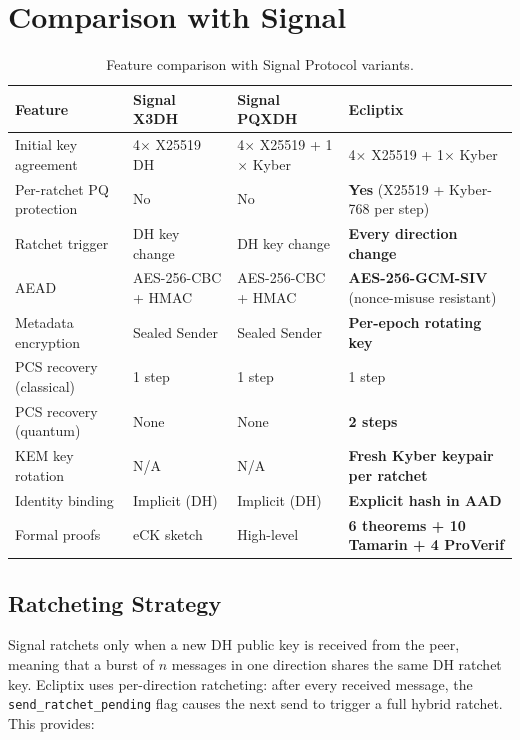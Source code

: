 \documentclass[11pt,a4paper]{article}
\theoremstyle{definition}
\begin{document}
\section{Comparison with Signal}\label{sec:comparison}

\begin{table}[H]
\centering
\caption{Feature comparison with Signal Protocol variants.}\label{tab:comparison}
\small
\begin{tabularx}{\textwidth}{@{}lXXX@{}}
\toprule
Feature & Signal X3DH & Signal PQXDH & \textbf{Ecliptix} \\
\midrule
Initial key agreement & 4$\times$ X25519 DH & 4$\times$ X25519 + 1$\times$ Kyber & 4$\times$ X25519 + 1$\times$ Kyber \\
Per-ratchet PQ protection & No & No & \textbf{Yes} (X25519 + Kyber-768 per step) \\
Ratchet trigger & DH key change & DH key change & \textbf{Every direction change} \\
AEAD & AES-256-CBC + HMAC & AES-256-CBC + HMAC & \textbf{AES-256-GCM-SIV} (nonce-misuse resistant) \\
Metadata encryption & Sealed Sender & Sealed Sender & \textbf{Per-epoch rotating key} \\
PCS recovery (classical) & 1 step & 1 step & 1 step \\
PCS recovery (quantum) & None & None & \textbf{2 steps} \\
KEM key rotation & N/A & N/A & \textbf{Fresh Kyber keypair per ratchet} \\
Identity binding & Implicit (DH) & Implicit (DH) & \textbf{Explicit hash in AAD} \\
Formal proofs & eCK sketch & High-level & \textbf{6 theorems + 10 Tamarin + 4 ProVerif} \\
\bottomrule
\end{tabularx}
\end{table}

\subsection{Ratcheting Strategy}

Signal ratchets only when a new DH public key is received from the peer, meaning that a burst of $n$ messages in one direction shares the same DH ratchet key. Ecliptix uses per-direction ratcheting: after every received message, the \texttt{send\_ratchet\_pending} flag causes the next send to trigger a full hybrid ratchet. This provides:
\end{document}
